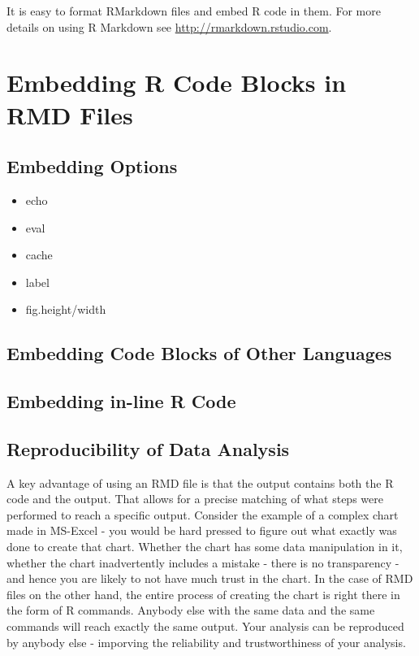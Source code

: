 \documentclass[]{krantz}
\providecommand{\tightlist}{%
  \setlength{\itemsep}{0pt}\setlength{\parskip}{0pt}}
\theoremstyle{definition}
\theoremstyle{definition}
\theoremstyle{definition}
\theoremstyle{remark}
\begin{document}
It is easy to format RMarkdown files and embed R code in them. For more
details on using R Markdown see \url{http://rmarkdown.rstudio.com}.

\section{Embedding R Code Blocks in RMD
Files}\label{embedding-r-code-blocks-in-rmd-files}

\subsection{Embedding Options}\label{embedding-options}

\begin{itemize}
\tightlist
\item
  echo
\item
  eval
\item
  cache
\item
  label
\item
  fig.height/width
\end{itemize}

\subsection{Embedding Code Blocks of Other
Languages}\label{embedding-code-blocks-of-other-languages}

\subsection{Embedding in-line R Code}\label{embedding-in-line-r-code}

\subsection{Reproducibility of Data
Analysis}\label{reproducibility-of-data-analysis}

A key advantage of using an RMD file is that the output contains both
the R code and the output. That allows for a precise matching of what
steps were performed to reach a specific output. Consider the example of
a complex chart made in MS-Excel - you would be hard pressed to figure
out what exactly was done to create that chart. Whether the chart has
some data manipulation in it, whether the chart inadvertently includes a
mistake - there is no transparency - and hence you are likely to not
have much trust in the chart. In the case of RMD files on the other
hand, the entire process of creating the chart is right there in the
form of R commands. Anybody else with the same data and the same
commands will reach exactly the same output. Your analysis can be
reproduced by anybody else - imporving the reliability and
trustworthiness of your analysis.
\end{document}
